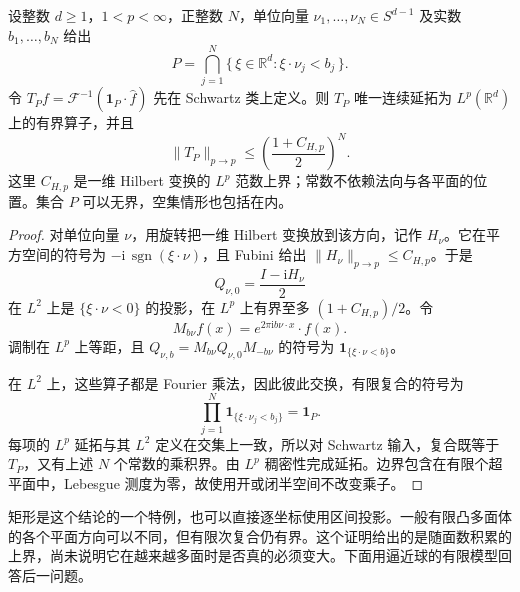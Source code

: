 \begin{proposition}[有限半空间交的投影]\label{b2:prop:24-polytope-projection}
设整数 \(d\geq1\)，\(1<p<\infty\)，正整数 \(N\)，单位向量
\(\nu_1,\ldots,\nu_N\in S^{d-1}\) 及实数 \(b_1,\ldots,b_N\) 给出
\[
 P=\bigcap_{j=1}^N\{\,\xi\in\mathbb R^d:\xi\cdot\nu_j<b_j\,\}.
\]
令 \(T_Pf=\mathcal F^{-1}(\mathbf1_P\cdot\widehat f)\) 先在 Schwartz 类上定义。则 \(T_P\) 唯一连续延拓为 \(L^p(\mathbb R^d)\) 上的有界算子，并且
\[
 \|T_P\|_{p\to p}\leq
 \left(\frac{1+C_{H,p}}2\right)^N.
\]
这里 \(C_{H,p}\) 是一维 Hilbert 变换的 \(L^p\) 范数上界；常数不依赖法向与各平面的位置。集合 \(P\) 可以无界，空集情形也包括在内。
\end{proposition}
\begin{proof}
对单位向量 \(\nu\)，用旋转把一维 Hilbert 变换放到该方向，记作 \(H_\nu\)。它在平方空间的符号为
\(-\mathrm i\,\operatorname{sgn}(\xi\cdot\nu)\)，且 Fubini 给出
\(\|H_\nu\|_{p\to p}\leq C_{H,p}\)。于是
\[
 Q_{\nu,0}=\frac{I-\mathrm iH_\nu}{2}
\]
在 \(L^2\) 上是 \(\{\xi\cdot\nu<0\}\) 的投影，在 \(L^p\) 上有界至多 \((1+C_{H,p})/2\)。令
\[
 M_{b\nu}f(x)=e^{2\pi\mathrm i b\nu\cdot x}\cdot f(x).
\]
调制在 \(L^p\) 上等距，且
\(Q_{\nu,b}=M_{b\nu}Q_{\nu,0}M_{-b\nu}\)
的符号为 \(\mathbf1_{\{\xi\cdot\nu<b\}}\)。

在 \(L^2\) 上，这些算子都是 Fourier 乘法，因此彼此交换，有限复合的符号为
\[
 \prod_{j=1}^N\mathbf1_{\{\xi\cdot\nu_j<b_j\}}=\mathbf1_P.
\]
每项的 \(L^p\) 延拓与其 \(L^2\) 定义在交集上一致，所以对 Schwartz 输入，复合既等于 \(T_P\)，又有上述 \(N\) 个常数的乘积界。由 \(L^p\) 稠密性完成延拓。边界包含在有限个超平面中，Lebesgue 测度为零，故使用开或闭半空间不改变乘子。
\end{proof}

矩形是这个结论的一个特例，也可以直接逐坐标使用区间投影。一般有限凸多面体的各个平面方向可以不同，但有限次复合仍有界。这个证明给出的是随面数积累的上界，尚未说明它在越来越多面时是否真的必须变大。下面用逼近球的有限模型回答后一问题。

